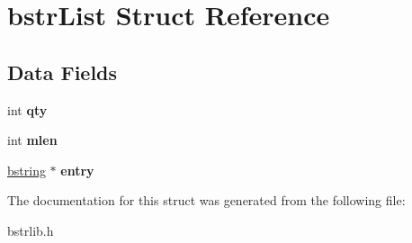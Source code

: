 \hypertarget{structbstrList}{}\section{bstr\+List Struct Reference}
\label{structbstrList}
\subsection*{Data Fields}
\begin{DoxyCompactItemize}
\item 
\hypertarget{structbstrList_a23465fcc1c43891c136fead866a30a0e}{}int {\bfseries qty}\label{structbstrList_a23465fcc1c43891c136fead866a30a0e}

\item 
\hypertarget{structbstrList_a27cec944f3421d6faaaaca651391eeb3}{}int {\bfseries mlen}\label{structbstrList_a27cec944f3421d6faaaaca651391eeb3}

\item 
\hypertarget{structbstrList_adab677d642e53205ebee8fd432977afc}{}\hyperlink{structtagbstring}{bstring} $\ast$ {\bfseries entry}\label{structbstrList_adab677d642e53205ebee8fd432977afc}

\end{DoxyCompactItemize}


The documentation for this struct was generated from the following file\+:\begin{DoxyCompactItemize}
\item 
bstrlib.\+h\end{DoxyCompactItemize}
